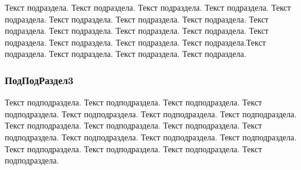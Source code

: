       Текст подраздела. Текст подраздела. Текст подраздела. Текст подраздела. Текст подраздела. Текст подраздела. Текст подраздела. Текст подраздела. Текст подраздела. Текст подраздела. Текст подраздела. Текст подраздела. Текст подраздела. Текст подраздела. Текст подраздела. Текст подраздела.Текст подраздела. Текст подраздела. Текст подраздела. Текст подраздела.
    \subsubsection{ПодПодРаздел3}


      Текст подподраздела. Текст подподраздела. Текст подподраздела. Текст подподраздела. Текст подподраздела. Текст подподраздела. Текст подподраздела. Текст подподраздела. Текст подподраздела. Текст подподраздела. Текст подподраздела. Текст подподраздела. Текст подподраздела. Текст подподраздела. Текст подподраздела. Текст подподраздела. Текст подподраздела. Текст подподраздела.
    
